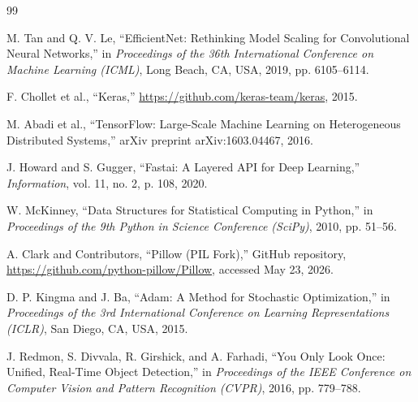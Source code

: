 \documentclass[11pt,a4paper,oneside]{article}
\begin{document}
\begin{thebibliography}{99}

M. Tan and Q. V. Le, ``EfficientNet: Rethinking Model Scaling for Convolutional Neural Networks,'' in \textit{Proceedings of the 36th International Conference on Machine Learning (ICML)}, Long Beach, CA, USA, 2019, pp. 6105--6114.

F. Chollet et al., ``Keras,'' \url{https://github.com/keras-team/keras}, 2015.

M. Abadi et al., ``TensorFlow: Large-Scale Machine Learning on Heterogeneous Distributed Systems,'' arXiv preprint arXiv:1603.04467, 2016.

J. Howard and S. Gugger, ``Fastai: A Layered API for Deep Learning,'' \textit{Information}, vol. 11, no. 2, p. 108, 2020.

W. McKinney, ``Data Structures for Statistical Computing in Python,'' in \textit{Proceedings of the 9th Python in Science Conference (SciPy)}, 2010, pp. 51--56.

A. Clark and Contributors, ``Pillow (PIL Fork),'' GitHub repository, \url{https://github.com/python-pillow/Pillow}, accessed May 23, 2026.

D. P. Kingma and J. Ba, ``Adam: A Method for Stochastic Optimization,'' in \textit{Proceedings of the 3rd International Conference on Learning Representations (ICLR)}, San Diego, CA, USA, 2015.

J. Redmon, S. Divvala, R. Girshick, and A. Farhadi, ``You Only Look Once: Unified, Real-Time Object Detection,'' in \textit{Proceedings of the IEEE Conference on Computer Vision and Pattern Recognition (CVPR)}, 2016, pp. 779--788.

\end{thebibliography}
\end{document}

